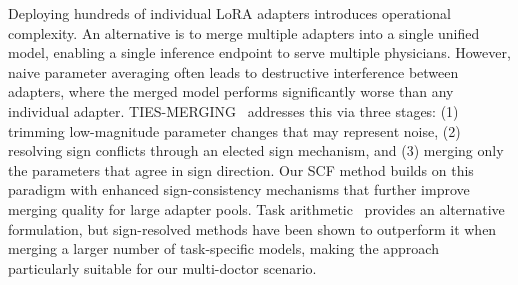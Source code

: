 Deploying hundreds of individual LoRA adapters introduces operational complexity. An alternative is to merge multiple adapters into a single unified model, enabling a single inference endpoint to serve multiple physicians. However, naive parameter averaging often leads to destructive interference between adapters, where the merged model performs significantly worse than any individual adapter. TIES-MERGING~\cite{yadavTIESMergingResolvingInterference2023a} addresses this via three stages: (1) trimming low-magnitude parameter changes that may represent noise, (2) resolving sign conflicts through an elected sign mechanism, and (3) merging only the parameters that agree in sign direction. Our SCF method builds on this paradigm with enhanced sign-consistency mechanisms that further improve merging quality for large adapter pools. Task arithmetic~\cite{ilharco2023editing} provides an alternative formulation, but sign-resolved methods have been shown to outperform it when merging a larger number of task-specific models, making the approach particularly suitable for our multi-doctor scenario.
